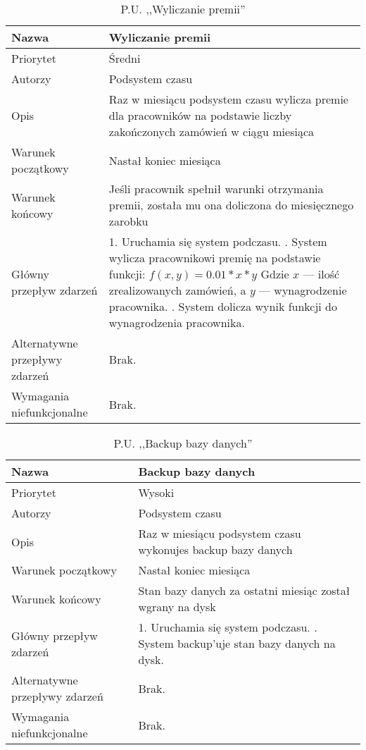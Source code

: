 \documentclass[a4page]{article}
\begin{document}
	\begin{table}
		\begin{tabular}{|l|p{5cm}|}
			\hline
			Nazwa & Wyliczanie premii\\
			\hline
			Priorytet & Średni\\
			\hline
			Autorzy & Podsystem czasu\\
			\hline
			Opis & Raz w miesiącu podsystem czasu wylicza premie dla pracowników
			na podstawie liczby zakończonych zamówień w ciągu miesiąca\\
			\hline
			Warunek początkowy & Nastał koniec miesiąca\\
			\hline
			Warunek końcowy & Jeśli pracownik spełnił warunki otrzymania premii, została mu ona doliczona do miesięcznego zarobku\\
			\hline
			Główny przepływ zdarzeń &
			1. Uruchamia się system podczasu.
			\newline
			2. System wylicza pracownikowi premię na podstawie funkcji: $f(x, y) = 0.01 * x * y$
			\newline
			Gdzie $x$ --- ilość zrealizowanych zamówień, a $y$ --- wynagrodzenie pracownika.
			\newline
			3. System dolicza wynik funkcji do wynagrodzenia pracownika.\\
			\hline
			Alternatywne przepływy zdarzeń & Brak.\\
			\hline
			Wymagania niefunkcjonalne & Brak.\\
			\hline
		\end{tabular}
		\caption{P.U. ,,Wyliczanie premii''}
	\end{table}

	\begin{table}
		\begin{tabular}{|l|p{5cm}|}
			\hline
			Nazwa & Backup bazy danych\\
			\hline
			Priorytet & Wysoki\\
			\hline
			Autorzy & Podsystem czasu\\
			\hline
			Opis & Raz w miesiącu podsystem czasu wykonujes backup bazy danych\\
			\hline
			Warunek początkowy & Nastał koniec miesiąca\\
			\hline
			Warunek końcowy & Stan bazy danych za ostatni miesiąc został wgrany na dysk\\
			\hline
			Główny przepływ zdarzeń &
			1. Uruchamia się system podczasu.
			\newline
			2. System backup'uje stan bazy danych na dysk.\\
			\hline
			Alternatywne przepływy zdarzeń & Brak.\\
			\hline
			Wymagania niefunkcjonalne & Brak.\\
			\hline
		\end{tabular}
		\caption{P.U. ,,Backup bazy danych''}
	\end{table}
\end{document}
